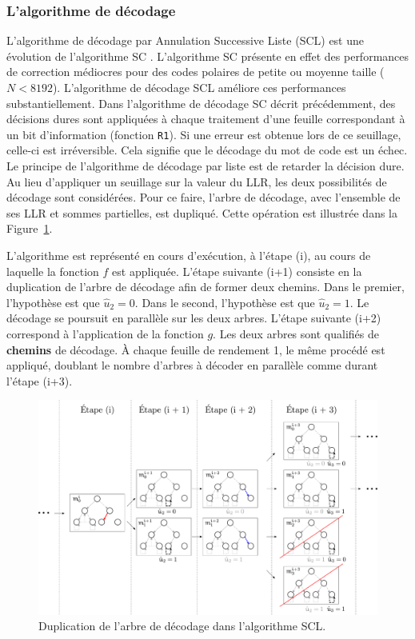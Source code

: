 \subsubsection{L'algorithme de décodage}
L'algorithme de décodage par Annulation Successive Liste (SCL) est une évolution de l'algorithme SC \cite{tal_list_2011}. L'algorithme SC présente en effet des performances de correction médiocres pour des codes polaires de petite ou moyenne taille ($N < 8192$). L'algorithme de décodage SCL améliore ces performances substantiellement. Dans l'algorithme de décodage SC décrit précédemment, des décisions dures sont appliquées à chaque traitement d'une feuille correspondant à un bit d'information (fonction \texttt{R1}). Si une erreur est obtenue lors de ce seuillage, celle-ci est irréversible. Cela signifie que le décodage du mot de code est un échec. Le principe de l'algorithme de décodage par liste est de retarder la décision dure. Au lieu d'appliquer un seuillage sur la valeur du LLR, les deux possibilités de décodage sont considérées. Pour ce faire, l'arbre de décodage, avec l'ensemble de ses LLR et sommes partielles, est dupliqué. Cette opération est illustrée dans la Figure~\ref{fig:scl}.

L'algorithme est représenté en cours d'exécution, à l'étape (i), au cours de laquelle la fonction $f$ est appliquée. L'étape suivante (i+1) consiste en la duplication de l'arbre de décodage afin de former deux chemins. Dans le premier, l'hypothèse est que $\hat{u}_2=0$. Dans le second, l'hypothèse est que $\hat{u}_2=1$. Le décodage se poursuit en parallèle sur les deux arbres. L'étape suivante (i+2) correspond à l'application de la fonction $g$. Les deux arbres sont qualifiés de \textbf{chemins} de décodage. \`A chaque feuille de rendement 1, le même procédé est appliqué, doublant le nombre d'arbres à décoder en parallèle comme durant l'étape (i+3).

\begin{figure}[t]
\centering
\includegraphics[width=1\textwidth]{main/ch1_fig/scl}
\caption{Duplication de l'arbre de décodage dans l'algorithme SCL.}
\label{fig:scl}
\end{figure}

